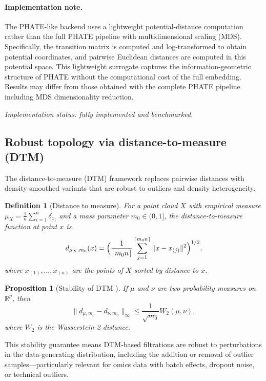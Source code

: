 \documentclass[11pt]{article}
\newtheorem{proposition}[theorem]{Proposition}
\newtheorem{definition}[theorem]{Definition}
\begin{document}
\paragraph{Implementation note.}
The PHATE-like backend uses a lightweight potential-distance computation rather than the full PHATE pipeline with multidimensional scaling (MDS).
Specifically, the transition matrix is computed and log-transformed to obtain potential coordinates, and pairwise Euclidean distances are computed in this potential space.
This lightweight surrogate captures the information-geometric structure of PHATE without the computational cost of the full embedding.
Results may differ from those obtained with the complete PHATE pipeline including MDS dimensionality reduction.

\emph{Implementation status: fully implemented and benchmarked.}

\subsection{Robust topology via distance-to-measure (DTM)}
\label{sec:dtm}

The distance-to-measure (DTM) framework \cite{chazal2011dtm, chazal2017robust} replaces pairwise distances with density-smoothed variants that are robust to outliers and density heterogeneity.

\begin{definition}[Distance to measure]\label{def:dtm}
For a point cloud $X$ with empirical measure $\mu_X = \frac{1}{n}\sum_{i=1}^n \delta_{x_i}$ and a mass parameter $m_0 \in (0,1]$, the \emph{distance-to-measure function} at point $x$ is
\[
d_{\mu_X, m_0}(x) = \Bigl( \frac{1}{\lceil m_0 n \rceil} \sum_{j=1}^{\lceil m_0 n \rceil} \|x - x_{(j)}\|^2 \Bigr)^{1/2},
\]
where $x_{(1)}, \ldots, x_{(n)}$ are the points of $X$ sorted by distance to $x$.
\end{definition}

\begin{proposition}[Stability of DTM \cite{chazal2011dtm}]\label{prop:dtm}
If $\mu$ and $\nu$ are two probability measures on $\mathbb{R}^p$, then
\[
\|d_{\mu, m_0} - d_{\nu, m_0}\|_\infty \le \frac{1}{\sqrt{m_0}} W_2(\mu, \nu),
\]
where $W_2$ is the Wasserstein-2 distance.
\end{proposition}

This stability guarantee means DTM-based filtrations are robust to perturbations in the data-generating distribution, including the addition or removal of outlier samples---particularly relevant for omics data with batch effects, dropout noise, or technical outliers.
\end{document}
